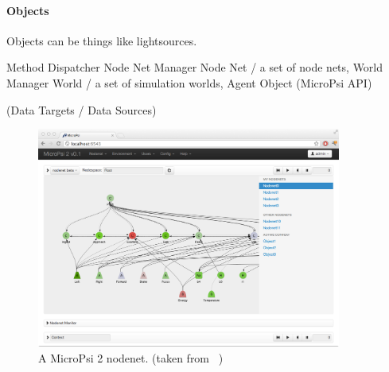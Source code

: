         \paragraph{Objects}
Objects can be things like lightsources.
 
    Method Dispatcher
    Node Net Manager
        Node Net / a set of node nets,
    World Manager
        World / a set of simulation worlds,
            Agent
            Object
    (MicroPsi API)
    



(Data Targets / Data Sources)







\begin{figure}[h]
  \centering
    \includegraphics[width=10cm]{graphics/micropsi2_nodenet}
  \caption{A MicroPsi 2 nodenet. (taken from ~\cite{conf/agi/Bach12})}
  \label{micropsi2_nodenet}
\end{figure}